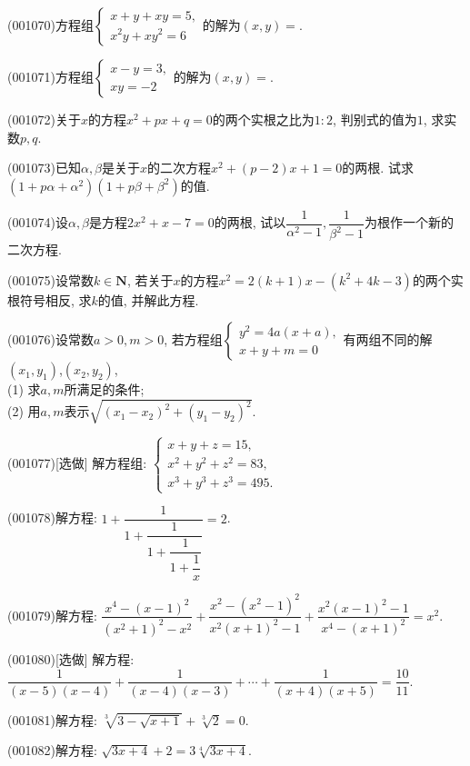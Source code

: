 \item (001070)方程组$\left\{
\begin{array}{l}
x+y+xy=5,\\
x^2y+xy^2=6
\end{array}
\right.$的解为$(x,y)=$.
\item (001071)方程组$\left\{
\begin{array}{l}
x-y=3,\\
xy=-2
\end{array}
\right.$的解为$(x,y)=$.
\item (001072)关于$x$的方程$x^2+px+q=0$的两个实根之比为$1:2$, 判别式的值为$1$, 求实数$p,q$.
\item (001073)已知$\alpha,\beta$是关于$x$的二次方程$x^2+(p-2)x+1=0$的两根. 试求$(1+p\alpha+\alpha^2)(1+p\beta+\beta^2)$的值.
\item (001074)设$\alpha,\beta$是方程$2x^2+x-7=0$的两根, 试以$\dfrac{1}{\alpha^2-1},\dfrac{1}{\beta^2-1}$为根作一个新的二次方程.
\item (001075)设常数$k\in\mathbf{N}$, 若关于$x$的方程$x^2=2(k+1)x-(k^2+4k-3)$的两个实根符号相反, 求$k$的值,
并解此方程.
\item (001076)设常数$a>0,m>0$, 若方程组$\left\{
\begin{array}{l}
y^2=4a(x+a),\\
x+y+m=0
\end{array}
\right.$有两组不同的解$(x_1,y_1)$,$(x_2,y_2)$,\\ 
(1) 求$a,m$所满足的条件;\\ 
(2) 用$a,m$表示$\sqrt{(x_1-x_2)^2+(y_1-y_2)^2}$.
\item (001077)[选做]
解方程组: $\left\{
\begin{array}{l}
x+y+z=15,\\
x^2+y^2+z^2=83,\\
x^3+y^3+z^3=495.
\end{array}\right.$
\item (001078)解方程: $1+\dfrac{1}{1+\dfrac{1}{1+\dfrac{1}{1+\dfrac{1}{x}}}}=2$.
\item (001079)解方程: $\dfrac{x^4-(x-1)^2}{(x^2+1)^2-x^2}+\dfrac{x^2-(x^2-1)^2}{x^2(x+1)^2-1}+\dfrac{x^2(x-1)^2-1}{x^4-(x+1)^2}=x^2$.
\item (001080)[选做]
解方程: $\dfrac{1}{(x-5)(x-4)}+\dfrac{1}{(x-4)(x-3)}+\cdots+\dfrac{1}{(x+4)(x+5)}=\dfrac{10}{11}$.
\item (001081)解方程: $\sqrt[3]{3-\sqrt{x+1}}+\sqrt[3]{2}=0$.
\item (001082)解方程: $\sqrt{3x+4}+2=3\sqrt[4]{3x+4}$.
